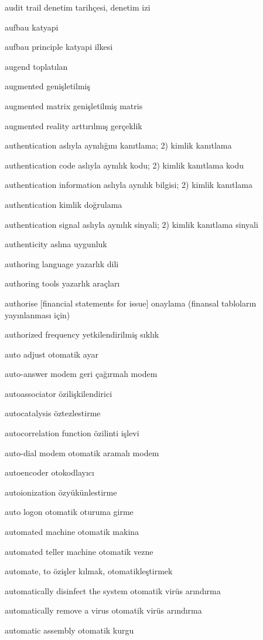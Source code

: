 \documentclass[12pt,fleqn]{article}\usepackage{../../common}
\begin{document}
audit trail denetim tarihçesi, denetim izi

aufbau katyapi

aufbau principle katyapi ilkesi

augend toplatılan

augmented genişletilmiş

augmented matrix genişletilmiş matris

augmented reality arttırılmış gerçeklik

authentication aslıyla aynılığını kanıtlama; 2) kimlik kanıtlama

authentication code aslıyla aynılık kodu; 2) kimlik kanıtlama kodu

authentication information aslıyla aynılık bilgisi; 2) kimlik kanıtlama

authentication kimlik doğrulama

authentication signal aslıyla aynılık sinyali; 2) kimlik kanıtlama sinyali

authenticity aslına uygunluk

authoring language yazarlık dili

authoring tools yazarlık araçları

authorise [financial statements for issue] onaylama (finansal tabloların yayınlanması için)

authorized frequency yetkilendirilmiş sıklık

auto adjust otomatik ayar

auto-answer modem geri çağırmalı modem

autoassociator özilişkilendirici

autocatalysis öztezlestirme

autocorrelation function özilinti işlevi

auto-dial modem otomatik aramalı modem

autoencoder otokodlayıcı

autoionization özyükünlestirme

auto logon otomatik oturuma girme

automated machine otomatik makina

automated teller machine otomatik vezne

automate, to özişler kılmak, otomatikleştirmek

automatically disinfect the system otomatik virüs arındırma

automatically remove a virus otomatik virüs arındırma

automatic assembly otomatik kurgu
\end{document}
